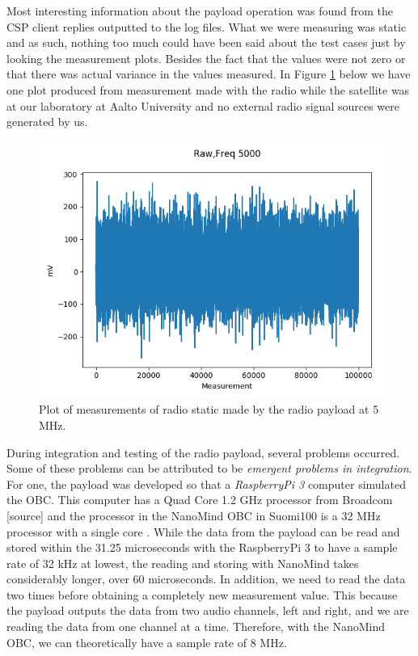 \documentclass[english,12pt,a4paper,pdftex,elec,utf8]{aaltothesis}
\begin{document}
Most interesting information about the payload operation was found from the CSP client replies outputted to the log files. What we were measuring was static and as such, nothing too much could have been said about the test cases just by looking the measurement plots. Besides the fact that the values were not zero or that there was actual variance in the values measured. In Figure \ref{m1_debug1joo} below we have one plot produced from measurement made with the radio while the satellite was at our laboratory at Aalto University and no external radio signal sources were generated by us.\par 
\begin{figure}[h!]
\centering
\includegraphics[scale=0.6]{m1_debug1}
\caption{Plot of measurements of radio static made by the radio payload at 5 MHz.}
\label{m1_debug1joo}
\end{figure}
During integration and testing of the radio payload, several problems occurred. Some of these problems can be attributed to be \textit{emergent problems in integration}. For one, the payload was developed so that a \textit{RaspberryPi 3} computer simulated the OBC. This computer has a Quad Core 1.2 GHz processor from Broadcom [source] and the processor in the NanoMind OBC in Suomi100 is a 32 MHz processor with a single core \cite{nanomindds}. While the data from the payload can be read and stored within the 31.25 microseconds with the RaspberryPi 3 to have a sample rate of 32 kHz at lowest, the reading and storing with NanoMind takes considerably longer, over 60 microseconds. In addition, we need to read the data two times before obtaining a completely new measurement value. This because the payload outputs the data from two audio channels, left and right, and we are reading the data from one channel at a time. Therefore, with the NanoMind OBC, we can theoretically have a sample rate of 8 MHz.\par
\end{document}
